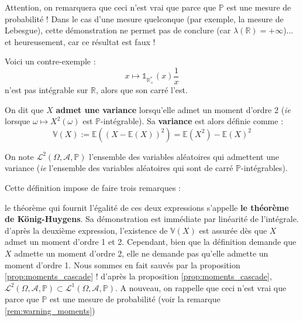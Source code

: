 \documentclass[../integ-proba.tex]{subfiles}
\begin{document}
\begin{rem}
    \label{rem:warning_moments}
    Attention, on remarquera que ceci n'est vrai que parce que $\mathbb{P}$ est une mesure de probabilité !
    Dans le cas d'une mesure quelconque (par exemple, la mesure de Lebesgue), cette démonstration ne permet pas de conclure (car $\lambda(\mathbb{R}) = +\infty$)... et heureusement, car ce résultat est faux !

    Voici un contre-exemple :
    $$x \mapsto \mathds{1}_{\mathbb{R}_+^*}(x)\frac{1}{x}$$
    n'est pas intégrable sur $\mathbb{R}$, alors que son carré l'est.
\end{rem}

\begin{defi}
    On dit que $X$ \textbf{admet une variance} lorsqu'elle admet un moment d'ordre 2 (\textit{ie} lorsque $\omega \mapsto X^2\left(\omega\right)$ est $\mathbb{P}$-intégrable).
    Sa \textbf{variance} est alors définie comme :
    $$
    \mathbb{V}(X):=\mathbb{E}\left(\left(X - \mathbb{E}\left(X\right)\right)^2\right)=\mathbb{E}\left(X^2\right) - \mathbb{E}\left(X\right)^2
    $$
    
    On note $\mathcal{L}^2\left(\Omega, \mathcal{A}, \mathbb{P}\right)$ l'ensemble des variables aléatoires qui admettent une variance (\textit{ie} l'ensemble des variables aléatoires qui sont de carré $\mathbb{P}$-intégrables).
\end{defi}

\begin{rem}
    Cette définition impose de faire trois remarques :
    \begin{itemize}
        \itemb le théorème qui fournit l'égalité de ces deux expressions s'appelle \textbf{le théorème de König-Huygens}. Sa démonstration est immédiate par linéarité de l'intégrale.
        \itemb d'après la deuxième expression, l'existence de $\mathbb{V}(X)$ est assurée dès que $X$ admet un moment d'ordre 1 et 2.
        Cependant, bien que la définition demande que $X$ admette un moment d'ordre 2, elle ne demande pas qu'elle admette un moment d'ordre 1.
        Nous sommes en fait sauvés par la proposition \ref{prop:moments_cascade} !
        \itemb d'après la proposition \ref{prop:moments_cascade}, $\mathcal{L}^2\left(\Omega, \mathcal{A}, \mathbb{P}\right) \subset \mathcal{L}^1\left(\Omega, \mathcal{A}, \mathbb{P}\right)$.
        A nouveau, on rappelle que ceci n'est vrai que parce que $\mathbb{P}$ est une mesure de probabilité (voir la remarque \ref{rem:warning_moments})
    \end{itemize}
\end{rem}
\end{document}
